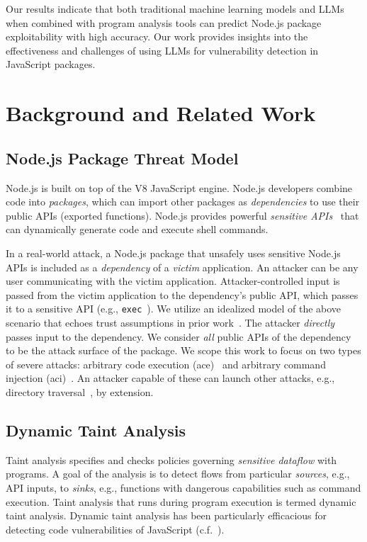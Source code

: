 \documentclass[12pt,openany,oneside,table]{cmuthesis}
\begin{document}
Our results indicate that 
both traditional machine learning models and LLMs when combined with program analysis tools can predict Node.js package exploitability with high accuracy.
Our work provides insights into the effectiveness and challenges of using LLMs for vulnerability detection in JavaScript packages.

\section{Background and Related Work}

\subsection{Node.js Package Threat Model}
\label{sec:background:threat-model}

Node.js is built on top of the V8 JavaScript engine. Node.js developers combine code into {\em packages}, which can import other packages as \emph{dependencies} to use their public APIs (exported functions). Node.js provides powerful \emph{sensitive APIs}~\cite{eval_fn,new_function_fn,exec_fn,execsync_fn} that can dynamically generate code and execute shell commands.

In a real-world attack, a Node.js package that unsafely uses sensitive Node.js APIs is included as a \emph{dependency} of a \emph{victim} application. An attacker can be any user communicating with the victim application. Attacker-controlled input is passed from the victim application to the dependency's public API, which passes it to a sensitive API (e.g., \lstinline|exec|~\cite{exec_fn}). We utilize an idealized model of the above scenario that echoes trust assumptions in prior work~\cite{staicu-SYNODE,nodemedic-fine,cassel2023nodemedic}. The attacker \emph{directly} passes input to the dependency. We consider \emph{all} public APIs of the dependency to be the attack surface of the package. We scope this work to focus on two types of severe attacks: arbitrary code execution (\gls{ace})~\cite{cwe_94} and arbitrary command injection (\gls{aci})~\cite{cwe_77}. An attacker capable of these can launch other attacks, e.g., directory traversal~\cite{cwe_22}, by extension.

\subsection{Dynamic Taint Analysis}

Taint analysis specifies and checks policies governing \emph{sensitive dataflow} with programs. A goal of the analysis is to detect flows from particular \emph{sources}, e.g., API inputs, to \emph{sinks}, e.g., functions with dangerous capabilities such as command execution. Taint analysis that runs during program execution is termed dynamic taint analysis. Dynamic taint analysis has been particularly efficacious for detecting code vulnerabilities of JavaScript (c.f.~\cite{andreasen-Survey}).
\end{document}

